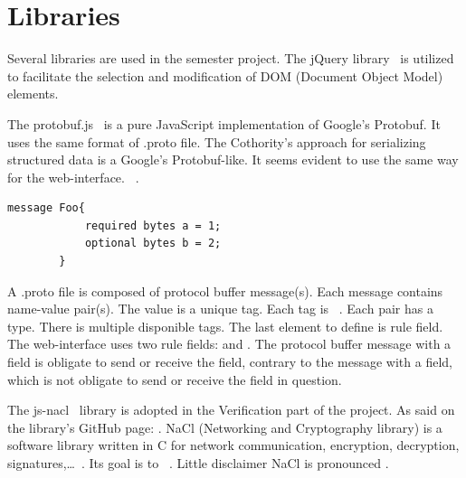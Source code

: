 \documentclass[11pt, a4paper, twoside, openright, openany]{book} %
\begin{document}
\section{Libraries}
Several libraries are used in the semester project.
\newline
The jQuery library~\cite{query} is utilized to
facilitate the selection and modification of DOM (Document Object Model) elements.
\bigbreak

The protobuf.js~\cite{protobufjs} is a pure JavaScript implementation of Google's Protobuf.
It uses the same format of .proto file.
The Cothority's approach for serializing structured data is a Google's Protobuf-like.
It seems evident to use the same way for the web-interface.
\newline
{}~\cite{protobufDefi}.
\bigbreak

\begin{lstlisting}[caption={Example of .proto file}, captionpos=b]
 message Foo{
            required bytes a = 1;
            optional bytes b = 2;
        }
\end{lstlisting}
\leavevmode \newline

A .proto file is composed of protocol buffer message(s). Each message contains name-value pair(s).
The value is a unique tag. Each tag is ~\cite{protobufDefi}.
Each pair has a type. There is multiple disponible tags.
\newline
The last element to define is rule field. The web-interface
uses two rule fields:  and . The protocol buffer message
with a  field is obligate to send or receive the field, contrary to
the message with a  field, which is not obligate to send or receive the field in question.
\bigbreak

The js-nacl~\cite{jsnacl} library is adopted in the Verification part of the project.
As said on the library's GitHub page: .
NaCl (Networking and Cryptography library) is a software library written in C for
network communication, encryption, decryption, signatures,\ldots~\cite{nacl}. Its
goal is to ~\cite{nacl}.
Little disclaimer NaCl is pronounced .
\bigbreak
\end{document}

